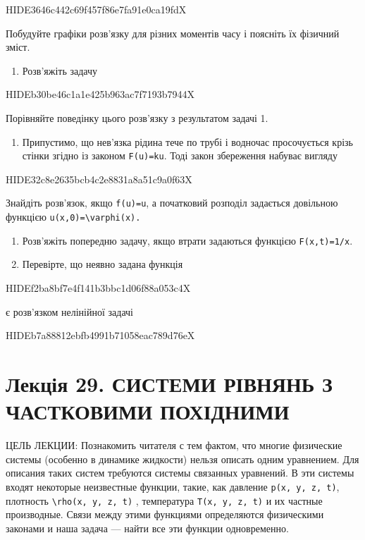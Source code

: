 \documentclass[
  ukrainian,
]{article}
\providecommand{\tightlist}{%
  \setlength{\itemsep}{0pt}\setlength{\parskip}{0pt}}
\begin{document}
HIDE3646c442c69f457f86e7fa91e0ca19fdX

Побудуйте графіки розв'язку для різних моментів часу і поясніть їх
фізичний зміст.

\begin{enumerate}
\def\labelenumi{\arabic{enumi}.}
\setcounter{enumi}{1}
\tightlist
\item
  Розв'яжіть задачу
\end{enumerate}

HIDEb30be46c1a1e425b963ac7f7193b7944X

Порівняйте поведінку цього розв'язку з результатом задачі 1.

\begin{enumerate}
\def\labelenumi{\arabic{enumi}.}
\setcounter{enumi}{2}
\tightlist
\item
  Припустимо, що нев'язка рідина тече по трубі і водночас просочується
  крізь стінки згідно із законом \texttt{F(u)=ku}. Тоді закон збереження
  набуває вигляду
\end{enumerate}

HIDE32c8e2635bcb4c2e8831a8a51c9a0f63X

Знайдіть розв'язок, якщо \texttt{f(u)=u}, а початковий розподіл
задається довільною функцією
\texttt{\textquotesingle{}u(x,0)=\textbackslash{}varphi(x)\textquotesingle{}.}

\begin{enumerate}
\def\labelenumi{\arabic{enumi}.}
\setcounter{enumi}{3}
\item
  Розв'яжіть попередню задачу, якщо втрати задаються функцією
  \texttt{F(x,t)=1/x}.
\item
  Перевірте, що неявно задана функція
\end{enumerate}

HIDEf2ba8bf7e4f141b3bbc1d06f88a053c4X

є розв'язком нелінійної задачі

HIDEb7a88812ebfb4991b71058eac789d76eX

\section{Лекція 29. СИСТЕМИ РІВНЯНЬ З ЧАСТКОВИМИ
ПОХІДНИМИ}\label{ux43bux435ux43aux446ux456ux44f-29.-ux441ux438ux441ux442ux435ux43cux438-ux440ux456ux432ux43dux44fux43dux44c-ux437-ux447ux430ux441ux442ux43aux43eux432ux438ux43cux438-ux43fux43eux445ux456ux434ux43dux438ux43cux438}

ЦЕЛЬ ЛЕКЦИИ: Познакомить читателя с тем фактом, что многие физические
системы (особенно в динамике жидкости) нельзя описать одним уравнением.
Для описания таких систем требуются системы связанных уравнений. В эти
системы входят некоторые неизвестные функции, такие, как давление
\texttt{p(x,\ y,\ z,\ t)}, плотность
\texttt{\textbackslash{}rho(x,\ y,\ z,\ t)} , температура
\texttt{T(x,\ y,\ z,\ t)} и их частные производные. Связи между этими
функциями определяются физическими законами и наша задача --- найти все
эти функции одновременно.
\end{document}
